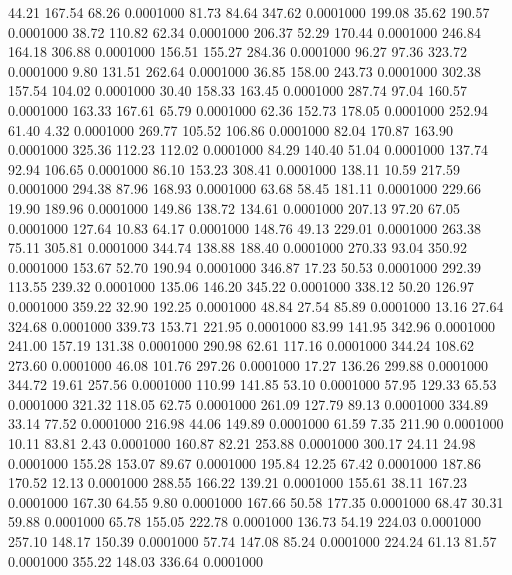   44.21  167.54   68.26   0.0001000
  81.73   84.64  347.62   0.0001000
 199.08   35.62  190.57   0.0001000
  38.72  110.82   62.34   0.0001000
 206.37   52.29  170.44   0.0001000
 246.84  164.18  306.88   0.0001000
 156.51  155.27  284.36   0.0001000
  96.27   97.36  323.72   0.0001000
   9.80  131.51  262.64   0.0001000
  36.85  158.00  243.73   0.0001000
 302.38  157.54  104.02   0.0001000
  30.40  158.33  163.45   0.0001000
 287.74   97.04  160.57   0.0001000
 163.33  167.61   65.79   0.0001000
  62.36  152.73  178.05   0.0001000
 252.94   61.40    4.32   0.0001000
 269.77  105.52  106.86   0.0001000
  82.04  170.87  163.90   0.0001000
 325.36  112.23  112.02   0.0001000
  84.29  140.40   51.04   0.0001000
 137.74   92.94  106.65   0.0001000
  86.10  153.23  308.41   0.0001000
 138.11   10.59  217.59   0.0001000
 294.38   87.96  168.93   0.0001000
  63.68   58.45  181.11   0.0001000
 229.66   19.90  189.96   0.0001000
 149.86  138.72  134.61   0.0001000
 207.13   97.20   67.05   0.0001000
 127.64   10.83   64.17   0.0001000
 148.76   49.13  229.01   0.0001000
 263.38   75.11  305.81   0.0001000
 344.74  138.88  188.40   0.0001000
 270.33   93.04  350.92   0.0001000
 153.67   52.70  190.94   0.0001000
 346.87   17.23   50.53   0.0001000
 292.39  113.55  239.32   0.0001000
 135.06  146.20  345.22   0.0001000
 338.12   50.20  126.97   0.0001000
 359.22   32.90  192.25   0.0001000
  48.84   27.54   85.89   0.0001000
  13.16   27.64  324.68   0.0001000
 339.73  153.71  221.95   0.0001000
  83.99  141.95  342.96   0.0001000
 241.00  157.19  131.38   0.0001000
 290.98   62.61  117.16   0.0001000
 344.24  108.62  273.60   0.0001000
  46.08  101.76  297.26   0.0001000
  17.27  136.26  299.88   0.0001000
 344.72   19.61  257.56   0.0001000
 110.99  141.85   53.10   0.0001000
  57.95  129.33   65.53   0.0001000
 321.32  118.05   62.75   0.0001000
 261.09  127.79   89.13   0.0001000
 334.89   33.14   77.52   0.0001000
 216.98   44.06  149.89   0.0001000
  61.59    7.35  211.90   0.0001000
  10.11   83.81    2.43   0.0001000
 160.87   82.21  253.88   0.0001000
 300.17   24.11   24.98   0.0001000
 155.28  153.07   89.67   0.0001000
 195.84   12.25   67.42   0.0001000
 187.86  170.52   12.13   0.0001000
 288.55  166.22  139.21   0.0001000
 155.61   38.11  167.23   0.0001000
 167.30   64.55    9.80   0.0001000
 167.66   50.58  177.35   0.0001000
  68.47   30.31   59.88   0.0001000
  65.78  155.05  222.78   0.0001000
 136.73   54.19  224.03   0.0001000
 257.10  148.17  150.39   0.0001000
  57.74  147.08   85.24   0.0001000
 224.24   61.13   81.57   0.0001000
 355.22  148.03  336.64   0.0001000

